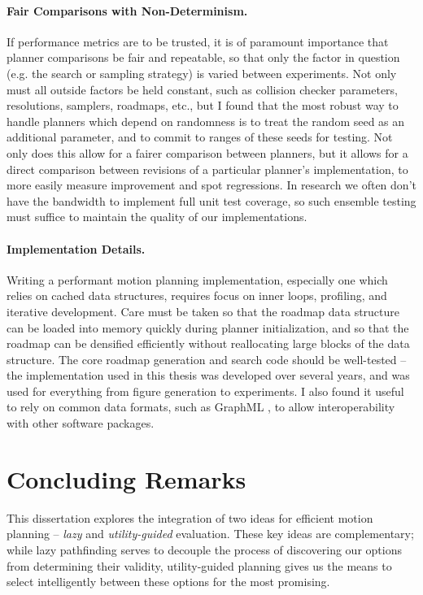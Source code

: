 \paragraph{Fair Comparisons with Non-Determinism.}
If performance metrics are to be trusted,
it is of paramount importance that planner comparisons be fair
and repeatable,
so that only the factor in question
(e.g. the search or sampling strategy) is varied between experiments.
Not only must all outside factors be held constant,
such as collision checker parameters, resolutions, samplers, roadmaps, etc.,
but I found that the most robust way to handle planners which depend
on randomness is to treat the random seed as an additional parameter,
and to commit to ranges of these seeds for testing.
Not only does this allow for a fairer comparison between planners,
but it allows for a direct comparison between revisions of a particular
planner's implementation,
to more easily measure improvement and spot regressions.
In research we often don't have the bandwidth to implement full
unit test coverage, so such ensemble testing must suffice to maintain
the quality of our implementations.

\paragraph{Implementation Details.}
Writing a performant motion planning implementation,
especially one which relies on cached data structures,
requires focus on inner loops, profiling, and iterative development.
Care must be taken so that the roadmap data structure can be loaded
into memory quickly during planner initialization,
and so that the roadmap can be densified efficiently without
reallocating large blocks of the data structure.
The core roadmap generation and search code should be well-tested --
the implementation used in this thesis was developed over several years,
and was used for everything from figure generation to experiments.
I also found it useful to rely on common data formats,
such as GraphML \citep{brandesetal2002graphml},
to allow interoperability with other software packages.

\section{Concluding Remarks}
\label{sec:conclusion:remarks}

This dissertation explores the integration of two ideas
for efficient motion planning
-- \emph{lazy} and \emph{utility-guided} evaluation.
These key ideas are complementary;
while lazy pathfinding serves to decouple the process of
discovering our options from determining their validity,
utility-guided planning gives us the means to select intelligently
between these options for the most promising.

